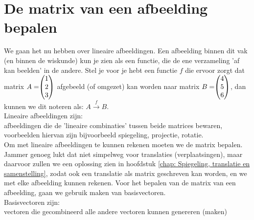 \section{De matrix van een afbeelding bepalen}
We gaan het nu hebben over lineaire afbeeldingen. Een afbeelding binnen dit vak (en binnen de wiskunde) kun je zien als een functie, die de ene verzameling 'af kan beelden' in de andere. Stel je voor je hebt een functie $f$ die ervoor zorgt dat matrix $A = \vecdrie{1}{2}{3} $ afgebeeld (of omgezet) kan worden naar matrix $B = \vecdrie{4}{5}{6} $, dan kunnen we dit noteren als: $A \xrightarrow{f} B$. \\
{Lineaire afbeeldingen zijn: \\ afbeeldingen die de 'lineaire combinaties' tussen beide matrices bewaren, voorbeelden hiervan zijn bijvoorbeeld spiegeling, projectie, rotatie.} \\
Om met lineaire afbeeldingen te kunnen rekenen moeten we de matrix bepalen. Jammer genoeg lukt dat niet simpelweg voor translaties (verplaatsingen), maar daarvoor zullen we een oplossing zien in hoofdstuk \ref{chap: Spiegeling, translatie en samenstelling}, zodat ook een translatie als matrix geschreven kan worden, en we met elke afbeelding kunnen rekenen. Voor het bepalen van de matrix van een afbeelding, gaan we gebruik maken van basisvectoren. \\
{Basisvectoren zijn: \\ vectoren die gecombineerd alle andere vectoren kunnen genereren (maken)} \\ 
 \\

